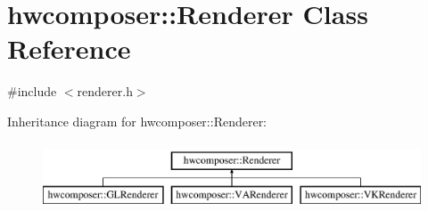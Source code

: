 \hypertarget{classhwcomposer_1_1Renderer}{}\section{hwcomposer\+:\+:Renderer Class Reference}
\label{classhwcomposer_1_1Renderer}


{\ttfamily \#include $<$renderer.\+h$>$}

Inheritance diagram for hwcomposer\+:\+:Renderer\+:\begin{figure}[H]
\begin{center}
\leavevmode
\includegraphics[height=2.000000cm]{classhwcomposer_1_1Renderer}
\end{center}
\end{figure}
